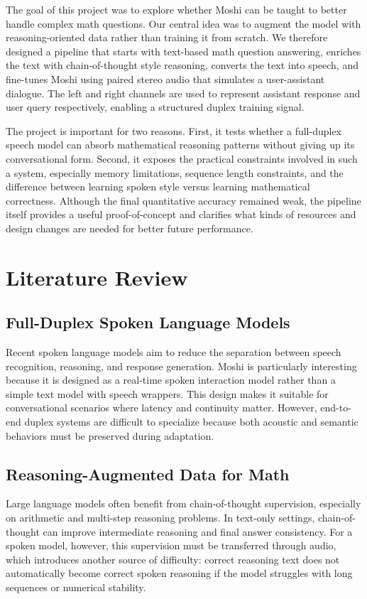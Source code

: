 \documentclass[12pt,a4paper]{article}
\begin{document}
The goal of this project was to explore whether Moshi can be taught to better handle complex math questions. Our central idea was to augment the model with reasoning-oriented data rather than training it from scratch. We therefore designed a pipeline that starts with text-based math question answering, enriches the text with chain-of-thought style reasoning, converts the text into speech, and fine-tunes Moshi using paired stereo audio that simulates a user-assistant dialogue. The left and right channels are used to represent assistant response and user query respectively, enabling a structured duplex training signal.

The project is important for two reasons. First, it tests whether a full-duplex speech model can absorb mathematical reasoning patterns without giving up its conversational form. Second, it exposes the practical constraints involved in such a system, especially memory limitations, sequence length constraints, and the difference between learning spoken style versus learning mathematical correctness. Although the final quantitative accuracy remained weak, the pipeline itself provides a useful proof-of-concept and clarifies what kinds of resources and design changes are needed for better future performance.

\section{Literature Review}
\subsection{Full-Duplex Spoken Language Models}
Recent spoken language models aim to reduce the separation between speech recognition, reasoning, and response generation. Moshi is particularly interesting because it is designed as a real-time spoken interaction model rather than a simple text model with speech wrappers. This design makes it suitable for conversational scenarios where latency and continuity matter. However, end-to-end duplex systems are difficult to specialize because both acoustic and semantic behaviors must be preserved during adaptation.

\subsection{Reasoning-Augmented Data for Math}
Large language models often benefit from chain-of-thought supervision, especially on arithmetic and multi-step reasoning problems. In text-only settings, chain-of-thought can improve intermediate reasoning and final answer consistency. For a spoken model, however, this supervision must be transferred through audio, which introduces another source of difficulty: correct reasoning text does not automatically become correct spoken reasoning if the model struggles with long sequences or numerical stability.
\end{document}
